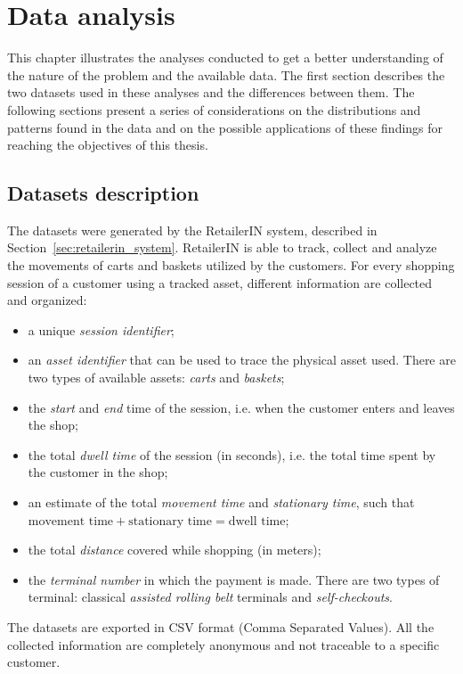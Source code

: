 \chapter{Data analysis}
\label{cha:data_analysis}

This chapter illustrates the analyses conducted to get a better understanding of the nature of the problem and the available data. The first section describes the two datasets used in these analyses and the differences between them. The following sections present a series of considerations on the distributions and patterns found in the data and on the possible applications of these findings for reaching the objectives of this thesis.

\section{Datasets description}
\label{sec:datasets_description}

The datasets were generated by the RetailerIN system, described in Section~\ref{sec:retailerin_system}. RetailerIN is able to track, collect and analyze the movements of carts and baskets utilized by the customers. For every shopping session of a customer using a tracked asset, different information are collected and organized:
\begin{itemize}
  \item a unique \emph{session identifier};
  \item an \emph{asset identifier} that can be used to trace the physical asset used. There are two types of available assets: \emph{carts} and \emph{baskets};
  \item the \emph{start} and \emph{end} time of the session, i.e. when the customer enters and leaves the shop;
  \item the total \emph{dwell time} of the session (in seconds), i.e. the total time spent by the customer in the shop;
  \item an estimate of the total \emph{movement time} and \emph{stationary time}, such that \( \text{movement time} + \text{stationary time} = \text{dwell time} \);
  \item the total \emph{distance} covered while shopping (in meters);
  \item the \emph{terminal number} in which the payment is made. There are two types of terminal: classical \emph{assisted rolling belt} terminals and \emph{self-checkouts}.
\end{itemize}
The datasets are exported in CSV format (Comma Separated Values). All the collected information are completely anonymous and not traceable to a specific customer.

